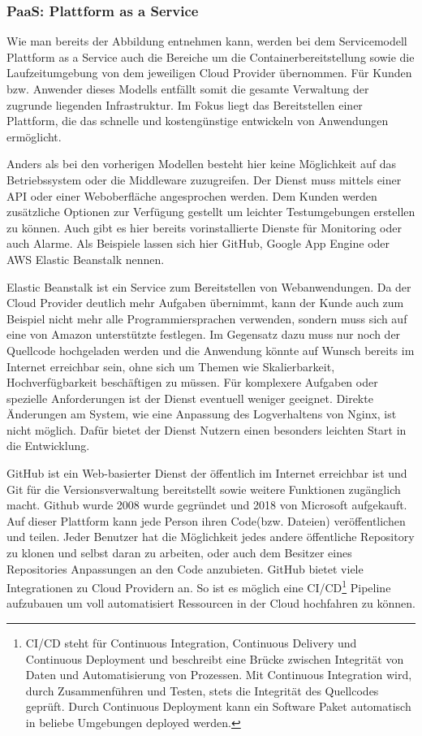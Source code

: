    \subsubsection{PaaS: Plattform as a Service}
   Wie man bereits der Abbildung entnehmen kann, werden bei dem Servicemodell Plattform as a Service auch die Bereiche um die
   Containerbereitstellung sowie die Laufzeitumgebung von dem jeweiligen Cloud Provider übernommen. Für Kunden bzw. Anwender dieses Modells
   entfällt somit die gesamte Verwaltung der zugrunde liegenden Infrastruktur. Im Fokus liegt das Bereitstellen einer Plattform, die das
   schnelle und kostengünstige entwickeln von Anwendungen ermöglicht.


   Anders als bei den vorherigen Modellen besteht hier keine Möglichkeit auf das Betriebssystem oder die Middleware zuzugreifen.
   Der Dienst muss mittels einer API oder einer Weboberfläche angesprochen werden. Dem Kunden werden zusätzliche Optionen
   zur Verfügung gestellt um leichter Testumgebungen erstellen zu können. Auch gibt es hier bereits vorinstallierte Dienste für Monitoring oder auch Alarme.
   Als Beispiele lassen sich hier GitHub, Google App Engine oder AWS Elastic Beanstalk nennen.


   Elastic Beanstalk ist ein Service zum Bereitstellen von Webanwendungen. Da der Cloud Provider deutlich mehr Aufgaben übernimmt, kann der Kunde
   auch zum Beispiel nicht mehr alle Programmiersprachen verwenden, sondern muss sich auf eine von Amazon unterstützte festlegen.
   Im Gegensatz dazu muss nur noch der Quellcode hochgeladen werden und die Anwendung könnte auf Wunsch bereits im Internet erreichbar sein, ohne sich um Themen
   wie Skalierbarkeit, Hochverfügbarkeit beschäftigen zu müssen. Für komplexere Aufgaben oder spezielle Anforderungen ist der Dienst eventuell weniger geeignet.
   Direkte Änderungen am System, wie eine Anpassung des Logverhaltens von Nginx, ist nicht möglich. Dafür bietet der Dienst
   Nutzern einen besonders leichten Start in die Entwicklung.

   GitHub ist ein Web-basierter Dienst der öffentlich im Internet erreichbar ist und Git für die Versionsverwaltung bereitstellt sowie weitere Funktionen zugänglich macht.
   Github wurde 2008 wurde gegründet und 2018 von Microsoft aufgekauft. Auf dieser Plattform kann jede Person ihren Code(bzw. Dateien) veröffentlichen und teilen.
   Jeder Benutzer hat die Möglichkeit jedes andere öffentliche Repository zu klonen und selbst daran zu arbeiten, oder auch dem Besitzer eines Repositories
   Anpassungen an den Code anzubieten. GitHub bietet viele Integrationen zu Cloud Providern an. So ist es möglich eine CI/CD\footnote{CI/CD steht für
   Continuous Integration, Continuous Delivery und Continuous Deployment und beschreibt eine Brücke zwischen Integrität von Daten und Automatisierung von Prozessen.
   Mit Continuous Integration wird, durch Zusammenführen und Testen, stets die Integrität des Quellcodes geprüft. Durch Continuous Deployment kann ein Software Paket
   automatisch in beliebe Umgebungen deployed werden. } Pipeline aufzubauen um voll automatisiert
   Ressourcen in der Cloud hochfahren zu können. \cite[]{GitHub}


